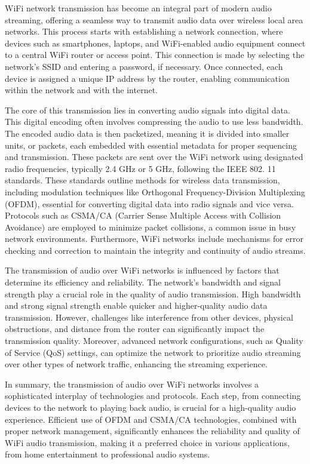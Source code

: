 \documentclass[conference]{IEEEtran}
\begin{document}
WiFi network transmission has become an integral part of modern audio streaming, offering a
seamless way to transmit audio data over wireless local area networks. This process starts with
establishing a network connection, where devices such as smartphones, laptops, and WiFi-enabled
audio equipment connect to a central WiFi router or access point. This connection is made by
selecting the network's SSID and entering a password, if necessary. Once connected, each device
is assigned a unique IP address by the router, enabling communication within the network and
with the internet.

The core of this transmission lies in converting audio signals into digital data. This digital
encoding often involves compressing the audio to use less bandwidth. The encoded audio data is
then packetized, meaning it is divided into smaller units, or packets, each embedded with
essential metadata for proper sequencing and transmission. These packets are sent over the WiFi
network using designated radio frequencies, typically 2.4 GHz or 5 GHz, following the IEEE 802.
11 standards. These standards outline methods for wireless data transmission, including
modulation techniques like Orthogonal Frequency-Division Multiplexing (OFDM), essential for
converting digital data into radio signals and vice versa. Protocols such as CSMA/CA (Carrier
Sense Multiple Access with Collision Avoidance) are employed to minimize packet collisions, a
common issue in busy network environments. Furthermore, WiFi networks include mechanisms for
error checking and correction to maintain the integrity and continuity of audio streams.

The transmission of audio over WiFi networks is influenced by factors that determine its
efficiency and reliability. The network's bandwidth and signal strength play a crucial role in
the quality of audio transmission. High bandwidth and strong signal strength enable quicker and
higher-quality audio data transmission. However, challenges like interference from other
devices, physical obstructions, and distance from the router can significantly impact the
transmission quality. Moreover, advanced network configurations, such as Quality of Service
(QoS) settings, can optimize the network to prioritize audio streaming over other types of
network traffic, enhancing the streaming experience.

In summary, the transmission of audio over WiFi networks involves a sophisticated interplay of technologies and protocols. Each step, from connecting devices to the network to playing back audio, is crucial for a high-quality audio experience. Efficient use of OFDM and CSMA/CA technologies, combined with proper network management, significantly enhances the reliability and quality of WiFi audio transmission, making it a preferred choice in various applications, from home entertainment to professional audio systems.
\end{document}
